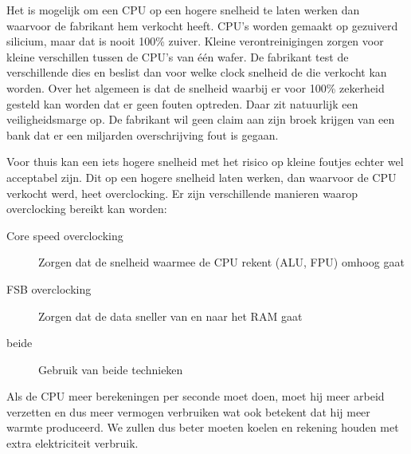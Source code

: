 Het is mogelijk om een CPU op een hogere snelheid te laten werken dan waarvoor de fabrikant hem verkocht heeft. CPU's worden gemaakt op gezuiverd silicium, maar dat is nooit 100\% zuiver. Kleine verontreinigingen zorgen voor kleine verschillen tussen de CPU's van \'e\'en wafer. De fabrikant test de verschillende dies en beslist dan voor welke clock snelheid de die verkocht kan worden. Over het algemeen is dat de snelheid waarbij er voor 100\% zekerheid gesteld kan worden dat er geen fouten optreden. Daar zit natuurlijk een veiligheidsmarge op. De fabrikant wil geen claim aan zijn broek krijgen van een bank dat er een miljarden overschrijving fout is gegaan.

Voor thuis kan een iets hogere snelheid met het risico op kleine foutjes echter wel acceptabel zijn. Dit op een hogere snelheid laten werken, dan waarvoor de CPU verkocht werd, heet overclocking. Er zijn verschillende manieren waarop overclocking bereikt kan worden:
\begin{description}
\item[Core speed overclocking] Zorgen dat de snelheid waarmee de CPU rekent (ALU, FPU) omhoog gaat
\item[FSB overclocking] Zorgen dat de data sneller van en naar het RAM gaat
\item[beide] Gebruik van beide technieken
\end{description}

Als de CPU meer berekeningen per seconde moet doen, moet hij meer arbeid verzetten en dus meer vermogen verbruiken wat ook betekent dat hij meer warmte produceerd. We zullen dus beter moeten koelen en rekening houden met extra elektriciteit verbruik.

